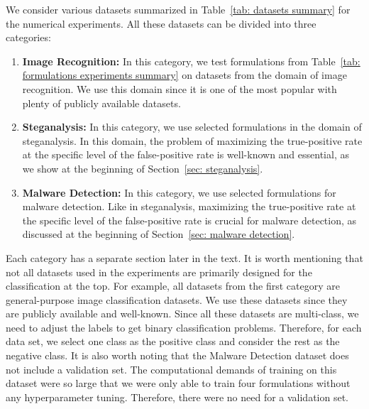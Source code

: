 We consider various datasets summarized in Table~\ref{tab: datasets summary} for the numerical experiments. All these datasets can be divided into three categories:
\begin{enumerate}
  \item \textbf{Image Recognition:} In this category, we test formulations from Table~\ref{tab: formulations experiments summary} on datasets from the domain of image recognition. We use this domain since it is one of the most popular with plenty of publicly available datasets.
  \item \textbf{Steganalysis:} In this category, we use selected formulations in the domain of steganalysis. In this domain, the problem of maximizing the true-positive rate at the specific level of the false-positive rate is well-known and essential, as we show at the beginning of Section~\ref{sec: steganalysis}.
  \item \textbf{Malware Detection:} In this category, we use selected formulations for malware detection. Like in steganalysis, maximizing the true-positive rate at the specific level of the false-positive rate is crucial for malware detection, as discussed at the beginning of Section~\ref{sec: malware detection}.
\end{enumerate}
Each category has a separate section later in the text. It is worth mentioning that not all datasets used in the experiments are primarily designed for the classification at the top. For example, all datasets from the first category are general-purpose image classification datasets. We use these datasets since they are publicly available and well-known. Since all these datasets are multi-class, we need to adjust the labels to get binary classification problems. Therefore, for each data set, we select one class as the positive class and consider the rest as the negative class. It is also worth noting that the Malware Detection dataset does not include a validation set. The computational demands of training on this dataset were so large that we were only able to train four formulations without any hyperparameter tuning. Therefore, there were no need for a validation set.

